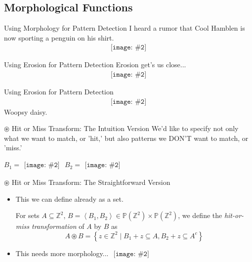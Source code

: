 \documentclass{beamer}
\newcommand{\pic}[2]{
     \begin{array}{l}
      \texttt{[image: \#2]}
      \end{array}
}
\newcommand{\set}[1]{\left\lbrace #1 \right\rbrace}
\newcommand{\buildset}[2]{\set{#1 \mid #2}}
\newcommand{\tuple}[1]{\left\langle #1 \right\rangle}
\newcommand{\power}[1]{\mathbb{P}\left(#1\right)}
\newcommand{\hitmiss}{\circledast}
\begin{document}
\subsection{Morphological Functions}

\begin{frame}{Using Morphology for Pattern Detection}
  I heard a rumor that Cool Hamblen is now sporting a penguin on his
  shirt. 
  $$\pic{width=100pt}{images/tux_coolhamblen.png}$$
\end{frame}

\begin{frame}{Using Erosion for Pattern Detection}
  Erosion get's us close...
  $$\pic{width=100pt}{images/tux_coolhamblenhit1.png}$$
\end{frame}

\begin{frame}{Using Erosion for Pattern Detection}
$$\pic{width=100pt}{images/tux_coolhamblenhit2.png}$$
Woopsy daisy.
\end{frame}

\begin{frame}{$\hitmiss$ Hit or Miss Transform: The Intuition Version}
  We'd like to specify not only what we want to match, or 'hit,' 
  but also patterns we DON'T want to match, or 'miss.'

  $B_1 = \pic{width=100pt}{images/binarytux.png}$ 
  $B_2 = \pic{width=100pt}{images/binarytuxmiss.png}$
\end{frame}


\begin{frame}{$\hitmiss$ Hit or Miss Transform: The Straightforward Version}

  \begin{itemize}
    \item This we can define already as a set.
          \begin{definition}
          For sets $A \subseteq \mathbb{Z}^2$,
                   $B = \tuple{B_1,B_2} \in \power{\mathbb{Z}^2} \times 
                                            \power{\mathbb{Z}^2}$,
          we define the \emph{hit-or-miss transformation} of 
          $A$ by $B$ as
          $$A \hitmiss B = \buildset{z \in \mathbb{Z}^2}
                                    {B_1+z \subseteq A,
                                     B_2+z \subseteq A^c}$$
          \end{definition}
    \item This needs more morphology... $\pic{width=75pt}{images/Walken-Cowbell.jpg}$
  \end{itemize}
\end{frame}
\end{document}
